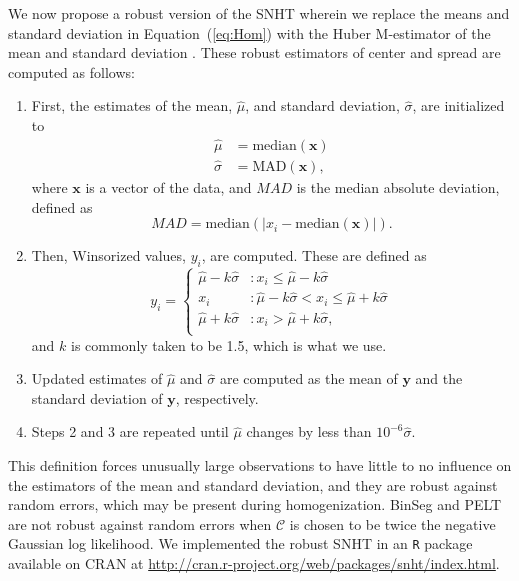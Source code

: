 \documentclass[12pt]{article}
\def\ni{\noindent}
\begin{document}
\begin{doublespacing}
We now propose a robust version of the SNHT wherein we replace the means and standard deviation in Equation~(\ref{eq:Hom}) with the Huber M-estimator of the mean and standard deviation \cite{huber11}.  These robust estimators of center and spread are computed as follows:
\begin{enumerate}
	\item First, the estimates of the mean, $\hat{\mu}$, and standard deviation, $\hat{\sigma}$, are initialized to
	\begin{align*}
		\hat{\mu} &= \mbox{median}(\mathbf{x})\\
		\hat{\sigma} &= \mbox{MAD}(\mathbf{x}),
	\end{align*}
	where $\mathbf{x}$ is a vector of the data, and $MAD$ is the median absolute deviation, defined as
	\begin{equation*}
		MAD = \mbox{median}( \lvert x_i - \mbox{median}(\mathbf{x}) \rvert ).
	\end{equation*}
	\item Then, Winsorized values, $y_i$, are computed.  These are defined as
	\begin{equation*}
		y_i = \left\{ \begin{array}{ll}
			\hat{\mu}-k \hat{\sigma} & : x_i \leq \hat{\mu}-k \hat{\sigma}\\
			x_i & : \hat{\mu}-k \hat{\sigma} < x_i \leq \hat{\mu}+k \hat{\sigma}\\
			\hat{\mu}+k \hat{\sigma} & : x_i > \hat{\mu}+k \hat{\sigma},\\
		\end{array} \right.
	\end{equation*}
	and $k$ is commonly taken to be 1.5, which is what we use.
	\item Updated estimates of $\hat{\mu}$ and $\hat{\sigma}$ are computed as the mean of $\mathbf{y}$ and the standard deviation of $\mathbf{y}$, respectively.
	\item Steps 2 and 3 are repeated until $\hat{\mu}$ changes by less than $10^{-6} \hat{\sigma}$.
\end{enumerate}

\ni This definition forces unusually large observations to have little to no influence on the estimators of the mean and standard deviation, and they are robust against random errors, which may be present during homogenization.  BinSeg and PELT are not robust against random errors when $\mathcal{C}$ is chosen to be twice the negative Gaussian log likelihood.  We implemented the robust SNHT in an \texttt{R} package available on CRAN at \url{http://cran.r-project.org/web/packages/snht/index.html}.


\end{doublespacing}
\end{document}
